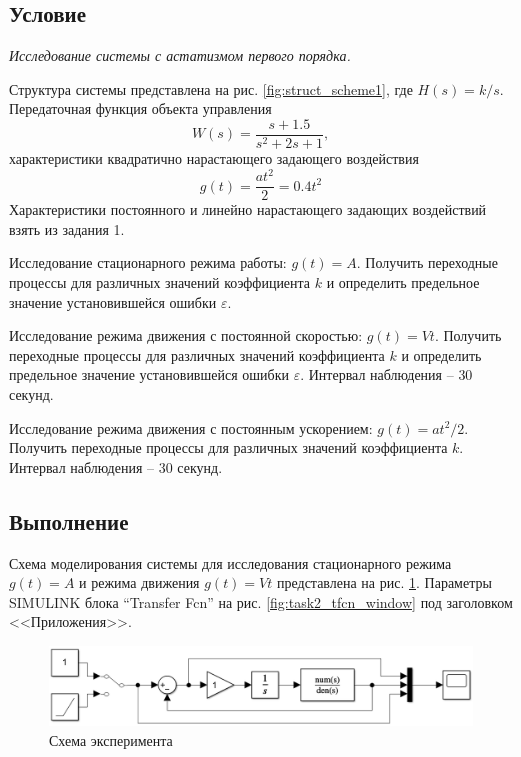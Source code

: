 \documentclass[a4paper, 12pt]{article}
\begin{document}
    \subsection{Условие}
    \textit{Исследование системы с астатизмом первого порядка.}
    \begin{compactitem}
    \item Структура системы представлена на рис. \ref{fig:struct_scheme1}, где
    $H(s)=k/s$. Передаточная функция объекта управления $$W(s)=\dfrac{s+1.5}{s^2+2s+1},$$
    характеристики квадратично нарастающего задающего воздействия $$g(t)=\dfrac{at^2}{2}=0.4t^2$$
    Характеристики постоянного и линейно нарастающего задающих воздействий взять из задания 1.
    \item Исследование стационарного режима работы: $g(t)=A$.
    Получить переходные процессы для различных значений коэффициента $k$ и определить предельное
    значение установившейся ошибки $\varepsilon$.
    \item Исследование режима движения с постоянной скоростью: $g(t)=Vt$.
    Получить переходные процессы для различных значений коэффициента $k$ и определить
    предельное значение установившейся ошибки $\varepsilon$. Интервал наблюдения -- $30$ секунд.
    \item Исследование режима движения с постоянным ускорением: $g(t)=at^2/2$.
    Получить переходные процессы для различных значений коэффициента $k$. Интервал
    наблюдения -- $30$ секунд.
    \end{compactitem}


    \subsection{Выполнение}
    Схема моделирования системы для исследования стационарного режима $g(t)=A$ и режима движения $g(t)=Vt$ представлена на рис. \ref{fig:scheme2_1_2}.
    Параметры SIMULINK блока ``Transfer Fcn'' на рис. \ref{fig:task2_tfcn_window} под заголовком <<Приложения>>.
    \begin{figure}[H]
        \centering
        \includegraphics[scale=0.6]{scheme2_1_2.png}
        \captionsetup{skip=0pt}
        \caption{Схема эксперимента}
        \label{fig:scheme2_1_2}
    \end{figure}
\end{document}
